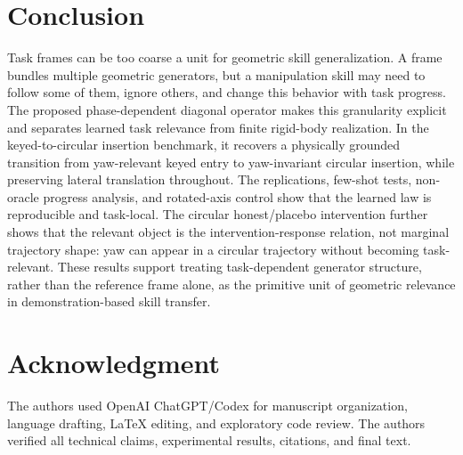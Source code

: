 \documentclass[letterpaper,10pt,conference]{ieeeconf}
\begin{document}
\section{Conclusion}
\label{sec:conclusion}

Task frames can be too coarse a unit for geometric skill generalization. A
frame bundles multiple geometric generators, but a manipulation skill may need
to follow some of them, ignore others, and change this behavior with task
progress. The proposed phase-dependent diagonal operator makes this granularity
explicit and separates learned task relevance from finite rigid-body
realization. In the keyed-to-circular insertion benchmark, it recovers a
physically grounded transition from yaw-relevant keyed entry to yaw-invariant
circular insertion, while preserving lateral translation throughout. The
replications, few-shot tests, non-oracle progress analysis, and rotated-axis
control show that the learned law is reproducible and task-local. The circular
honest/placebo intervention further shows that the relevant object is the
intervention-response relation, not marginal trajectory shape: yaw can appear
in a circular trajectory without becoming task-relevant. These results support
treating task-dependent generator structure, rather than the reference frame
alone, as the primitive unit of geometric relevance in demonstration-based
skill transfer.

\section*{Acknowledgment}
The authors used OpenAI ChatGPT/Codex for manuscript organization, language
drafting, LaTeX editing, and exploratory code review. The authors verified all
technical claims, experimental results, citations, and final text.



\end{document}
